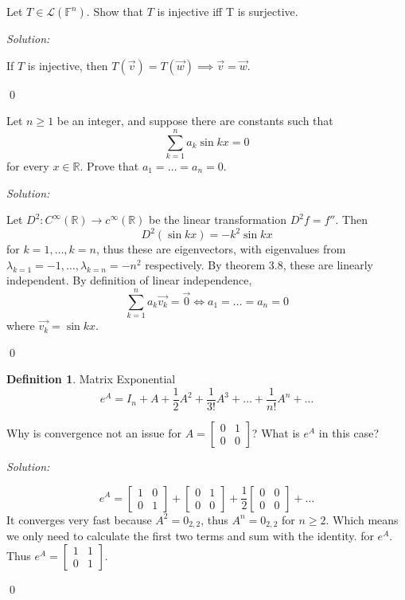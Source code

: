 \documentclass[11 pt]{article}
\newenvironment{problem}[2][Problem]{\begin{trivlist}
\item[\hskip \labelsep {\bfseries #1}\hskip \labelsep {\bfseries #2.}]}{\end{trivlist}}
\newenvironment{sol}
    {\emph{Solution:}
    }
    {
    \qed
    }
\theoremstyle{definition}
\newtheorem*{definition}{Definition}
\newcommand{\R}{\mathbb{R}} %
\newcommand{\F}{\mathbb{F}} %
\begin{document}
\begin{problem}{3.1.10b}
Let $T\in \mathcal{L}(\F^n)$. Show that $T$ is injective iff T is surjective.
\end{problem}
\begin{sol}
If $T$ is injective, then $T(\vec{v})=T(\vec{w})\implies \vec{v}=\vec{w}$. 
\end{sol}
\begin{problem}{3.1.14}
Let $n\geq 1$ be an integer, and suppose there are constants such that
\[\sum_{k=1}^{n}a_k\sin kx = 0\]
for every $x\in\R$. Prove that $a_1=\dots=a_n=0$.
\end{problem}
\begin{sol}
Let $D^2 : C^{\infty}(\R)\to c^{\infty}(\R)$ be the linear transformation $D^2 f = f''$. Then 
\[D^2(\sin kx) = - k^2\sin kx\]
for $k=1,\dots, k=n$, thus these are eigenvectors, with eigenvalues from $\lambda_{k=1} = -1,\dots, \lambda_{k=n} = -n^2$ respectively. By theorem 3.8, these are linearly independent. By definition of linear independence,
\[\sum_{k=1}^{n}a_k\vec{v_k}=\vec{0} \iff a_1=\dots=a_n=0\]
where $\vec{v_k}=\sin kx$.
\end{sol}
\pagebreak
\begin{definition}{Matrix Exponential}
\[e^A=I_n+A+\frac{1}{2}A^2+\frac{1}{3!}A^3+\dots+\frac{1}{n!}A^n+\dots\]
\end{definition}
\begin{problem}{M.1}
Why is convergence not an issue for $A=\begin{bmatrix}
0 & 1\\ 0 & 0
\end{bmatrix}$? What is $e^A$ in this case?
\end{problem}
\begin{sol}
\[e^A=\begin{bmatrix}
1 & 0 \\ 0 & 1
\end{bmatrix}+
\begin{bmatrix}
0 & 1\\ 0 & 0
\end{bmatrix}+\frac{1}{2}\begin{bmatrix}
0 & 0 \\ 0 & 0
\end{bmatrix}+\dots\]
It converges very fast because $A^2=0_{2,2}$, thus $A^n=0_{2,2}$ for $n\geq 2$. Which means we only need to calculate the first two terms and sum with the identity. for $e^A$.
Thus $e^A=\begin{bmatrix}
1 & 1\\ 0 & 1
\end{bmatrix}$.
\end{sol}
\end{document}
